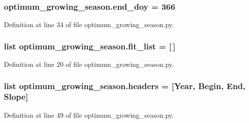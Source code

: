 \hypertarget{namespaceoptimum__growing__season_a14929bfec491de189c1e0e536710facd}{}
\subsubsection[{end\+\_\+doy}]{\setlength{\rightskip}{0pt plus 5cm}optimum\+\_\+growing\+\_\+season.\+end\+\_\+doy = 366}\label{namespaceoptimum__growing__season_a14929bfec491de189c1e0e536710facd}


Definition at line 34 of file optimum\+\_\+growing\+\_\+season.\+py.

\hypertarget{namespaceoptimum__growing__season_a85ef5ae3b7aeaa6d70cb52733a03aedf}{}
\subsubsection[{fit\+\_\+list}]{\setlength{\rightskip}{0pt plus 5cm}list optimum\+\_\+growing\+\_\+season.\+fit\+\_\+list = \mbox{[}$\,$\mbox{]}}\label{namespaceoptimum__growing__season_a85ef5ae3b7aeaa6d70cb52733a03aedf}


Definition at line 20 of file optimum\+\_\+growing\+\_\+season.\+py.

\hypertarget{namespaceoptimum__growing__season_ac9c7287c934ef72155dcfb3411443cde}{}
\subsubsection[{headers}]{\setlength{\rightskip}{0pt plus 5cm}list optimum\+\_\+growing\+\_\+season.\+headers = \mbox{[}\textquotesingle{}Year\textquotesingle{}, \textquotesingle{}Begin\textquotesingle{}, \textquotesingle{}End\textquotesingle{}, \textquotesingle{}Slope\textquotesingle{}\mbox{]}}\label{namespaceoptimum__growing__season_ac9c7287c934ef72155dcfb3411443cde}


Definition at line 49 of file optimum\+\_\+growing\+\_\+season.\+py.

\hypertarget{namespaceoptimum__growing__season_a13c3c4032d3b542bded1c71be14555e6}{}
